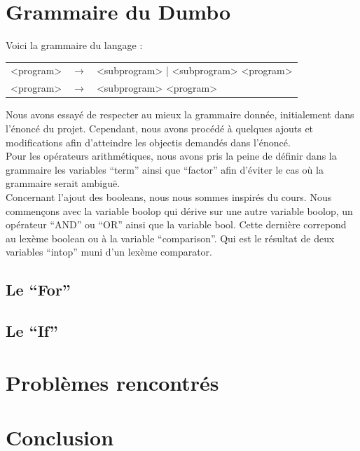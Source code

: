\documentclass[10pt,a4paper]{article}
\begin{document}
	\section{Grammaire du Dumbo}
	Voici la grammaire du langage :\\
	\begin{tabular}{|l l l|}
		\hline
		
		<program> & $\longrightarrow$ & <subprogram> | <subprogram> <program>\\
		<program> & $\longrightarrow$ & <subprogram> <program>\\
		
		\hline
	\end{tabular}
	
	Nous avons essayé de respecter au mieux la grammaire donnée, initialement dans l'énoncé du projet.
	Cependant, nous avons procédé à quelques ajouts et modifications afin d'atteindre les objectis demandés dans 
	l'énoncé.\\
	Pour les opérateurs arithmétiques, nous avons pris la peine de définir dans la grammaire les variables ``term'' ainsi que ``factor'' afin d'éviter
	le cas où la grammaire serait ambiguë.\\
	Concernant l'ajout des booleans, nous nous sommes inspirés du cours. Nous commençons avec la variable boolop qui dérive sur une autre variable
	boolop, un opérateur ``AND'' ou ``OR'' ainsi que la variable bool. Cette dernière correpond au lexème boolean ou à la variable ``comparison''.
	Qui est le résultat de deux variables ``intop'' muni d'un lexème comparator.
	\subsection{Le ``For''}
	\subsection{Le ``If''}
	\section{Problèmes rencontrés}
	\section{Conclusion}
\end{document}
